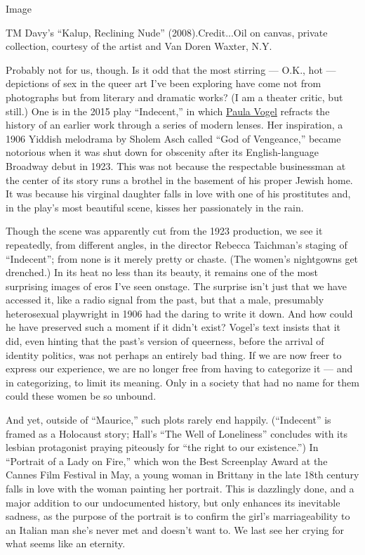 Image

TM Davy's ``Kalup, Reclining Nude'' (2008).Credit...Oil on canvas,
private collection, courtesy of the artist and Van Doren Waxter, N.Y.

Probably not for us, though. Is it odd that the most stirring --- O.K.,
hot --- depictions of sex in the queer art I've been exploring have come
not from photographs but from literary and dramatic works? (I am a
theater critic, but still.) One is in the 2015 play ``Indecent,'' in
which
\href{https://www.nytimes3xbfgragh.onion/topic/person/paula-vogel}{Paula
Vogel} refracts the history of an earlier work through a series of
modern lenses. Her inspiration, a 1906 Yiddish melodrama by Sholem Asch
called ``God of Vengeance,'' became notorious when it was shut down for
obscenity after its English-language Broadway debut in 1923. This was
not because the respectable businessman at the center of its story runs
a brothel in the basement of his proper Jewish home. It was because his
virginal daughter falls in love with one of his prostitutes and, in the
play's most beautiful scene, kisses her passionately in the rain.

Though the scene was apparently cut from the 1923 production, we see it
repeatedly, from different angles, in the director Rebecca Taichman's
staging of ``Indecent''; from none is it merely pretty or chaste. (The
women's nightgowns get drenched.) In its heat no less than its beauty,
it remains one of the most surprising images of eros I've seen onstage.
The surprise isn't just that we have accessed it, like a radio signal
from the past, but that a male, presumably heterosexual playwright in
1906 had the daring to write it down. And how could he have preserved
such a moment if it didn't exist? Vogel's text insists that it did, even
hinting that the past's version of queerness, before the arrival of
identity politics, was not perhaps an entirely bad thing. If we are now
freer to express our experience, we are no longer free from having to
categorize it --- and in categorizing, to limit its meaning. Only in a
society that had no name for them could these women be so unbound.

And yet, outside of ``Maurice,'' such plots rarely end happily.
(``Indecent'' is framed as a Holocaust story; Hall's ``The Well of
Loneliness'' concludes with its lesbian protagonist praying piteously
for ``the right to our existence.'') In ``Portrait of a Lady on Fire,''
which won the Best Screenplay Award at the Cannes Film Festival in May,
a young woman in Brittany in the late 18th century falls in love with
the woman painting her portrait. This is dazzlingly done, and a major
addition to our undocumented history, but only enhances its inevitable
sadness, as the purpose of the portrait is to confirm the girl's
marriageability to an Italian man she's never met and doesn't want to.
We last see her crying for what seems like an eternity.

